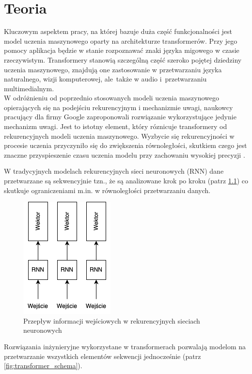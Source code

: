 \documentclass[12pt,a4paper,twoside]{book} %
\begin{document}
\chapter{Teoria}

Kluczowym aspektem pracy, na której bazuje duża część funkcjonalności jest model uczenia maszynowego oparty na architekturze transformerów. 
Przy jego pomocy aplikacja będzie w stanie rozpoznawać znaki języka migowego w czasie rzeczywistym.
Transformery stanowią szczególną część szeroko pojętej dziedziny uczenia maszynowego, znajdują one zastosowanie w przetwarzaniu języka naturalnego, wizji komputerowej, ale~także w audio i~przetwarzaniu multimedialnym. \\
W odróżnieniu od poprzednio stosowanych modeli uczenia maszynowego opierających się na podejściu rekurencyjnym i mechanizmie uwagi, naukowcy pracujący dla firmy Google zaproponowali rozwiązanie wykorzystujące jedynie mechanizm uwagi. 
Jest to istotny element, który róznicuje transformery od rekurencyjnych modeli uczenia maszynowego.
Wyzbycie się rekurencyjności w procesie uczenia przyczyniło się do zwiększenia równoległości, skutkiem czego jest znaczne przyspieszenie czasu uczenia modelu przy zachowaniu wysokiej precyzji \cite{vaswani2023attentionneed}.

W tradycyjnych modelach rekurencyjnych sieci neuronowych (RNN) dane przetwarzane są sekwencyjnie tzn., że są analizowane krok po kroku (patrz \ref{fig:rnn_schema}) \cite{mamczur2020} co skutkuje ograniczeniami m.in. w równoległości przetwarzaniu danych.


\begin{figure}[H]
    \centering
	\includegraphics[scale=0.60]{figs/rnn.png}
	\caption{Przepływ informacji wejściowych w rekurencyjnych sieciach neuronowych}
	\label{fig:rnn_schema}
\end{figure}

Rozwiązania inżynieryjne wykorzystane w transformerach pozwalają modelom na przetwarzanie wszystkich elementów sekwencji jednocześnie (patrz \ref{fig:transformer_schema}).
\end{document}
